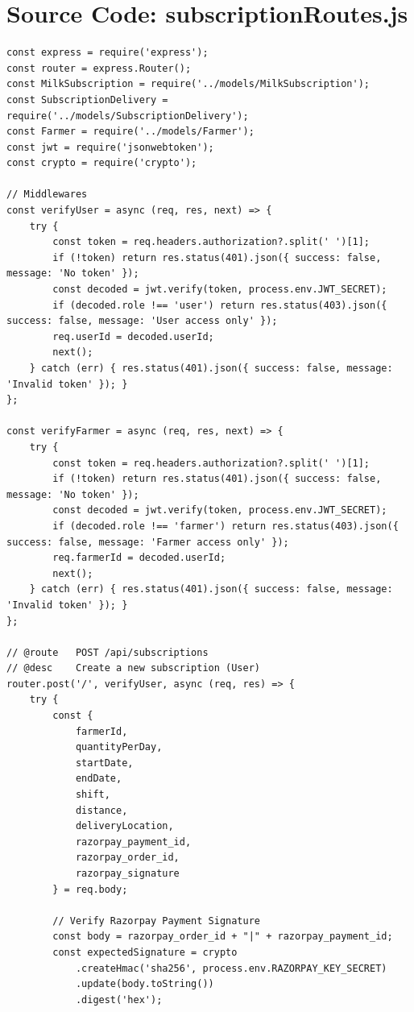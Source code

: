 \documentclass[12pt,a4paper]{report}
\begin{document}
\section{Source Code: subscriptionRoutes.js}
\begin{lstlisting}
const express = require('express');
const router = express.Router();
const MilkSubscription = require('../models/MilkSubscription');
const SubscriptionDelivery = require('../models/SubscriptionDelivery');
const Farmer = require('../models/Farmer');
const jwt = require('jsonwebtoken');
const crypto = require('crypto');

// Middlewares
const verifyUser = async (req, res, next) => {
    try {
        const token = req.headers.authorization?.split(' ')[1];
        if (!token) return res.status(401).json({ success: false, message: 'No token' });
        const decoded = jwt.verify(token, process.env.JWT_SECRET);
        if (decoded.role !== 'user') return res.status(403).json({ success: false, message: 'User access only' });
        req.userId = decoded.userId;
        next();
    } catch (err) { res.status(401).json({ success: false, message: 'Invalid token' }); }
};

const verifyFarmer = async (req, res, next) => {
    try {
        const token = req.headers.authorization?.split(' ')[1];
        if (!token) return res.status(401).json({ success: false, message: 'No token' });
        const decoded = jwt.verify(token, process.env.JWT_SECRET);
        if (decoded.role !== 'farmer') return res.status(403).json({ success: false, message: 'Farmer access only' });
        req.farmerId = decoded.userId;
        next();
    } catch (err) { res.status(401).json({ success: false, message: 'Invalid token' }); }
};

// @route   POST /api/subscriptions
// @desc    Create a new subscription (User)
router.post('/', verifyUser, async (req, res) => {
    try {
        const { 
            farmerId, 
            quantityPerDay, 
            startDate, 
            endDate, 
            shift, 
            distance, 
            deliveryLocation,
            razorpay_payment_id,
            razorpay_order_id,
            razorpay_signature
        } = req.body;

        // Verify Razorpay Payment Signature
        const body = razorpay_order_id + "|" + razorpay_payment_id;
        const expectedSignature = crypto
            .createHmac('sha256', process.env.RAZORPAY_KEY_SECRET)
            .update(body.toString())
            .digest('hex');


\end{lstlisting}
\end{document}
